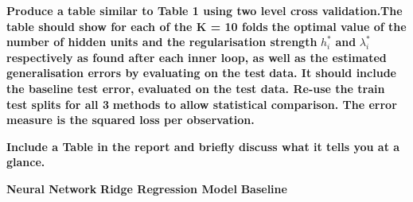 \documentclass[
]{article}
\begin{document}
\textbf{Produce a table similar to Table 1 using two level cross
validation.The table should show for each of the K = 10 folds}
\textbf{the optimal value of the number of hidden units and the
regularisation strength} \(h_{i}^*%
\) \textbf{and} \(\lambda_{i}^*\) \textbf{respectively as found after
each inner loop, as well as the estimated generalisation errors by
evaluating on the test} \textbf{data. It should include the baseline
test error, evaluated on the test data. Re-use the train test splits for
all 3} \textbf{methods to allow statistical comparison. The error
measure is the squared loss per observation.}

\textbf{Include a Table in the report and briefly discuss what it tells
you at a glance.}

\textbf{Neural Network} \textbf{Ridge Regression Model}
\textbf{Baseline}
\end{document}
